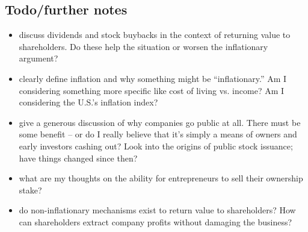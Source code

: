 \subsection{Todo/further notes}

\note{[Todo]:}
\begin{itemize}
    \item {} discuss dividends and stock buybacks in the context of returning value to shareholders.  Do these help the situation or worsen the inflationary argument?
    \item \note{[Inflation]:} clearly define inflation and why something might be ``inflationary.''  Am I considering something more specific like cost of living vs. income?  Am I considering the U.S.'s inflation index?
    \item \note{[IPOs]:} give a generous discussion of why companies go public at all.  There must be some benefit -- or do I really believe that it's simply a means of owners and early investors cashing out?  Look into the origins of public stock issuance; have things changed since then?
    \item {} what are my thoughts on the ability for entrepreneurs to sell their ownership stake?
    \item {} do non-inflationary mechanisms exist to return value to shareholders?  How can shareholders extract company profits without damaging the business?  
\end{itemize}